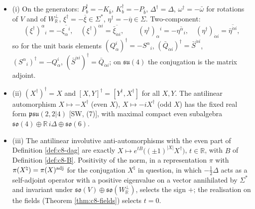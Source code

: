 \begin{theorem}
\label{thm:c8-dag}
\begin{itemize}
\item (i) On the generators: $P_b^\dagger=-K_{\bar b}$, $K_b^\dagger=-P_{\bar b}$, $\Delta^\dagger=\Delta$, $\omega^\dagger=-\bar\omega$ for rotations of $V$ and of $W_{\mathbb R}^\perp$, $\xi^\dagger=-\overline\xi\in\Sigma^*$, $\eta^\dagger=-\overline\eta\in\Sigma$. Two-component:
\[
(\xi^\dagger)^\alpha{}_i=-\overline{\xi_\alpha{}^i},\quad (\xi^\dagger)^{\dot\alpha i}=\overline{\bar\xi_{\dot\alpha i}},\qquad (\eta^\dagger)_\alpha{}^i=-\overline{\eta^\alpha{}_i},\quad (\eta^\dagger)_{\dot\alpha i}=\overline{\bar\eta^{\dot\alpha i}},
\]
so for the unit basis elements $(Q^i_\alpha)^\dagger=-S^\alpha{}_i$, $(\bar Q_{\dot\alpha i})^\dagger=\bar S^{\dot\alpha i}$, $(S^\alpha{}_i)^\dagger=-Q^i_\alpha$, $(\bar S^{\dot\alpha i})^\dagger=\bar Q_{\dot\alpha i}$; on $\mathfrak{su}(4)$ the conjugation is the matrix adjoint.
\item (ii) $(X^\dagger)^\dagger=X$ and $[X,Y]^\dagger=[Y^\dagger,X^\dagger]$ for all $X,Y$. The antilinear automorphism $X\mapsto-X^\dagger$ (even $X$), $X\mapsto-iX^\dagger$ (odd $X$) has the fixed real form $\mathfrak{psu}(2,2|4)$ [SW, (7)], with maximal compact even subalgebra $\mathfrak{so}(4)\oplus\mathbb R\,i\Delta\oplus\mathfrak{so}(6)$.
\item (iii) The antilinear involutive anti-automorphisms with the even part of Definition \ref{def:c8-dag} are exactly $X\mapsto e^{tB}\big((\pm1)^{|X|}X^\dagger\big)$, $t\in\mathbb R$, with $B$ of Definition \ref{def:c8-B}. Positivity of the norm, in a representation $\pi$ with $\pi(X^\natural)=\pi(X)^{\rm adj}$ for the conjugation $X^\natural$ in question, in which $-\tfrac12\Delta$ acts as a self-adjoint operator with a positive eigenvalue on a vector annihilated by $\Sigma^*$ and invariant under $\mathfrak{so}(V)\oplus\mathfrak{so}(W_{\mathbb R}^\perp)$, selects the sign $+$; the realisation on the fields (Theorem \ref{thm:c8-fields}) selects $t=0$.
\end{itemize}
\end{theorem}

